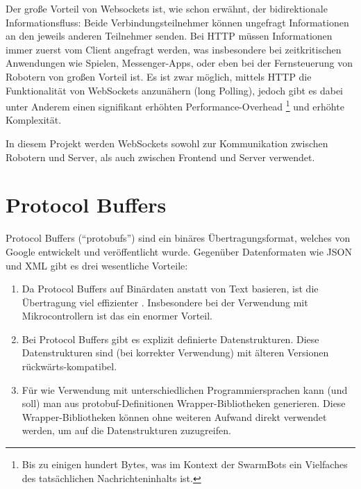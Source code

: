 Der große Vorteil von Websockets ist,
wie schon erwähnt,
der bidirektionale Informationsfluss:
%
Beide Verbindungsteilnehmer können ungefragt Informationen an den jeweils anderen Teilnehmer senden.
%
Bei HTTP müssen Informationen immer zuerst vom Client angefragt werden,
was insbesondere bei zeitkritischen Anwendungen wie Spielen,
Messenger-Apps,
oder eben bei der Fernsteuerung von Robotern von großen Vorteil ist.
%
Es ist zwar möglich,
mittels HTTP die Funktionalität von WebSockets anzunähern (long Polling),
jedoch gibt es dabei unter Anderem \cite{rfc6202} einen signifikant erhöhten Performance-Overhead%
\footnote{Bis zu einigen hundert Bytes,
  was im Kontext der SwarmBots ein Vielfaches des tatsächlichen Nachrichteninhalts ist.}
und erhöhte Komplexität.

In diesem Projekt werden WebSockets sowohl zur Kommunikation zwischen Robotern und Server,
als auch zwischen Frontend und Server verwendet.

\section{Protocol Buffers}
\label{subsec:ueberblick_protobufs}
Protocol Buffers \cite{protobufs} (``protobufs'') sind ein binäres Übertragungsformat,
welches von Google entwickelt und veröffentlicht wurde.
%
Gegenüber Datenformaten wie JSON und XML gibt es drei wesentliche Vorteile:
\begin{enumerate}
    \item Da Protocol Buffers auf Binärdaten anstatt von Text basieren,
    ist die Übertragung viel effizienter \cite{7765670}.
    Insbesondere bei der Verwendung mit Mikrocontrollern ist das ein enormer Vorteil.

    \item Bei Protocol Buffers gibt es explizit definierte Datenstrukturen.
    Diese Datenstrukturen sind (bei korrekter Verwendung) mit älteren Versionen rückwärts-kompatibel.

    \item Für wie Verwendung mit unterschiedlichen Programmiersprachen kann (und soll) man aus protobuf-Definitionen
    Wrapper-Bibliotheken generieren.
    Diese Wrapper-Bibliotheken können ohne weiteren Aufwand direkt verwendet werden,
    um auf die Datenstrukturen zuzugreifen.
\end{enumerate}

